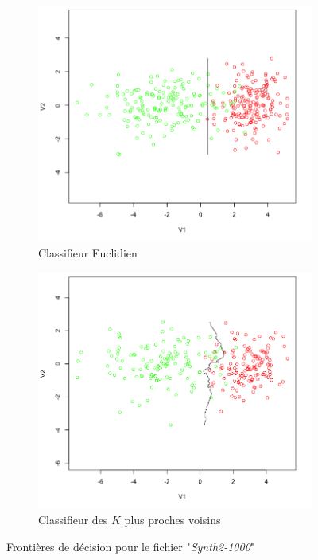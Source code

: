 \documentclass[a4paper,10pt]{report}
\begin{document}
\begin{figure}[H]
	\centering
	\captionsetup{justification=centering, margin=2cm}
	\begin{subfigure}[b]{0.5\linewidth}
		\centering
		\captionsetup{justification=centering, margin=1cm}
		\includegraphics[width=1\linewidth]{img/1-2-2-Synth2-1000-front-euc}
		\caption{\small Classifieur Euclidien}
	\end{subfigure}%
	\begin{subfigure}[b]{0.5\linewidth}
		\centering
		\captionsetup{justification=centering, margin=1cm}
		\includegraphics[width=1\linewidth]{img/1-2-2-Synth2-1000-front-kppv}
		\caption{\small Classifieur des $K$ plus proches voisins}
	\end{subfigure}%
	\caption{\small Frontières de décision pour le fichier "\textit{Synth2-1000}"}
	\label{fig:1-2-2-Synth2-1000-frontiere-decision}%
\end{figure}
\end{document}
